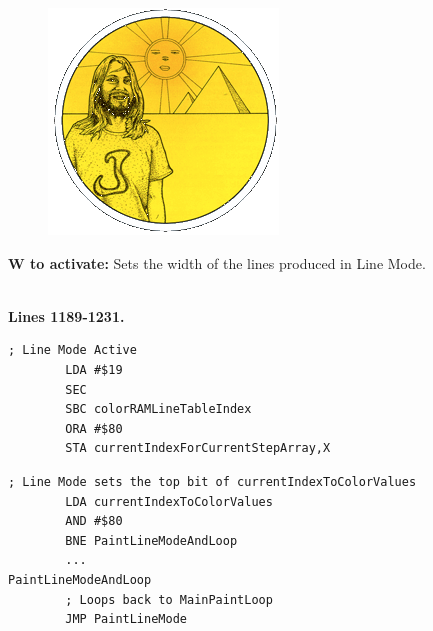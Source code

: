 \begin{definition}
\setlength{\intextsep}{0pt}%
\setlength{\columnsep}{3pt}%
\begin{figure}
\includegraphics[width=\linewidth]{src/callout/psych.png} 
\end{figure}
\textbf{W to activate:} Sets the width of the lines produced in Line Mode.
\\
\\
\end{definition}

\clearpage
\textbf{Lines 1189-1231. } 
\begin{lstlisting}[caption=From \icode{MainInterruptHandler}.]
        ; Line Mode Active
        LDA #$19
        SEC 
        SBC colorRAMLineTableIndex
        ORA #$80
        STA currentIndexForCurrentStepArray,X
\end{lstlisting}

\begin{lstlisting}[caption=From \icode{MainPaintLoop}.]
        ; Line Mode sets the top bit of currentIndexToColorValues
        LDA currentIndexToColorValues
        AND #$80
        BNE PaintLineModeAndLoop
        ...
PaintLineModeAndLoop
        ; Loops back to MainPaintLoop
        JMP PaintLineMode
\end{lstlisting}


